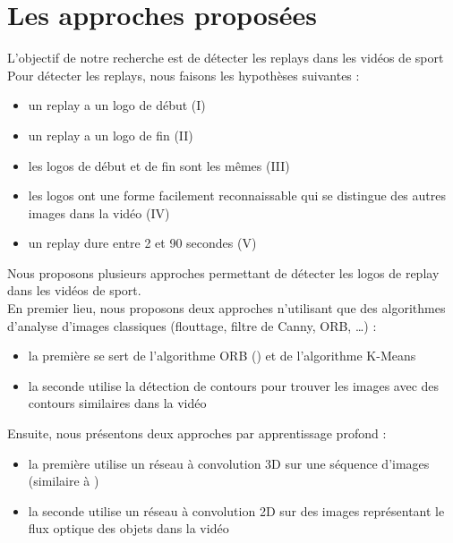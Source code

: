 \documentclass[11pt]{article}
\begin{document}
\newpage
\section{Les approches proposées}
\label{sec:orgd5a30ed}
L'objectif de notre recherche est de détecter les replays dans les vidéos de sport\\

Pour détecter les replays, nous faisons les hypothèses suivantes :\\
\begin{itemize}
\item un replay a un logo de début (I)\\
\item un replay a un logo de fin (II)\\
\item les logos de début et de fin sont les mêmes (III)\\
\item les logos ont une forme facilement reconnaissable qui se distingue des  autres images dans la vidéo (IV)\\
\item un replay dure entre 2 et 90 secondes (V)\\
\end{itemize}

Nous proposons plusieurs approches permettant de détecter les logos de replay dans les vidéos de sport.\\
En premier lieu, nous proposons deux approches n'utilisant que des algorithmes d'analyse d'images classiques (flouttage, filtre de Canny, ORB, \ldots{}) :\\
\begin{itemize}
\item la première se sert de l'algorithme ORB (\cite{Rublee_2011}) et de l'algorithme K-Means\\
\item la seconde utilise la détection de contours pour trouver les images avec des contours similaires dans la vidéo\\
\end{itemize}
Ensuite, nous présentons deux approches par apprentissage profond :\\
\begin{itemize}
\item la première utilise un réseau à convolution 3D sur une séquence d'images (similaire à \cite{Tran_2015})\\
\item la seconde utilise un réseau à convolution 2D sur des images représentant le flux optique des objets dans la vidéo\\
\end{itemize}
\end{document}
